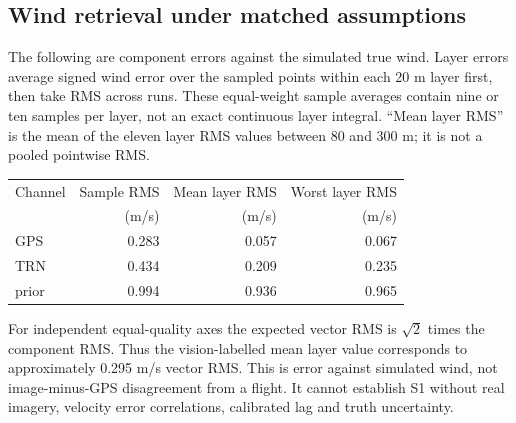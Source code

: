 \documentclass[11pt,a4paper]{article}
\numberwithin{equation}{section}
\begin{document}
\subsection{Wind retrieval under matched assumptions}
The following are component errors against the simulated true wind. Layer errors average signed wind error over the sampled points within each 20 m layer first, then take RMS across runs. These equal-weight sample averages contain nine or ten samples per layer, not an exact continuous layer integral. ``Mean layer RMS'' is the mean of the eleven layer RMS values between 80 and 300 m; it is not a pooled pointwise RMS.
\begin{center}
\begin{tabular}{lrrr}
\toprule
Channel & Sample RMS & Mean layer RMS & Worst layer RMS\\
 & (m/s) & (m/s) & (m/s)\\
\midrule
GPS & 0.283 & 0.057 & 0.067\\
TRN & 0.434 & 0.209 & 0.235\\
prior & 0.994 & 0.936 & 0.965\\
\bottomrule
\end{tabular}
\end{center}
For independent equal-quality axes the expected vector RMS is $\sqrt2$ times the component RMS. Thus the vision-labelled mean layer value corresponds to approximately 0.295 m/s vector RMS. This is error against simulated wind, not image-minus-GPS disagreement from a flight. It cannot establish S1 without real imagery, velocity error correlations, calibrated lag and truth uncertainty.
\end{document}
